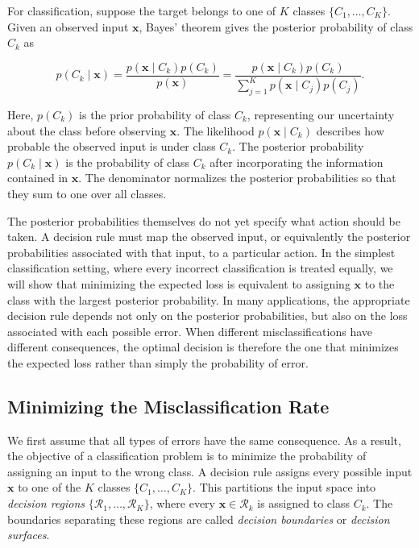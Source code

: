 \documentclass[10pt,twocolumn]{memoir}
\begin{document}
For classification, suppose the target belongs to one of $K$ classes $\{C_1,\ldots,C_K\}$. Given an observed input $\mathbf{x}$, Bayes' theorem gives the posterior probability of class $C_k$ as

\begin{equation}
    p(C_k\mid\mathbf{x}) = \frac{p(\mathbf{x}\mid C_k)p(C_k)}{p(\mathbf{x})} = \frac{p(\mathbf{x}\mid C_k)p(C_k)}{\sum_{j=1}^{K} p(\mathbf{x}\mid C_j)p(C_j)}.
\end{equation}

Here, $p(C_k)$ is the prior probability of class $C_k$, representing our uncertainty about the class before observing $\mathbf{x}$. The likelihood $p(\mathbf{x}\mid C_k)$ describes how probable the observed input is under class $C_k$. The posterior probability $p(C_k\mid\mathbf{x})$ is the probability of class $C_k$ after incorporating the information contained in $\mathbf{x}$. The denominator normalizes the posterior probabilities so that they sum to one over all classes.

The posterior probabilities themselves do not yet specify what action should be taken. A decision rule must map the observed input, or equivalently the posterior probabilities associated with that input, to a particular action. In the simplest classification setting, where every incorrect classification is treated equally, we will show that minimizing the expected loss is equivalent to assigning $\mathbf{x}$ to the class with the largest posterior probability. In many applications, the appropriate decision rule depends not only on the posterior probabilities, but also on the loss associated with each possible error. When different misclassifications have different consequences, the optimal decision is therefore the one that minimizes the expected loss rather than simply the probability of error.

\subsection{Minimizing the Misclassification Rate}

We first assume that all types of errors have the same consequence. As a result, the objective of a classification problem is to minimize the probability of assigning an input to the wrong class. A decision rule assigns every possible input $\mathbf{x}$ to one of the $K$ classes $\{C_1,\ldots,C_K\}$. This partitions the input space into \textit{decision regions} $\{\mathcal{R}_1,\ldots,\mathcal{R}_K\}$, where every $\mathbf{x}\in\mathcal{R}_k$ is assigned to class $C_k$. The boundaries separating these regions are called \textit{decision boundaries} or \textit{decision surfaces}.
\end{document}
